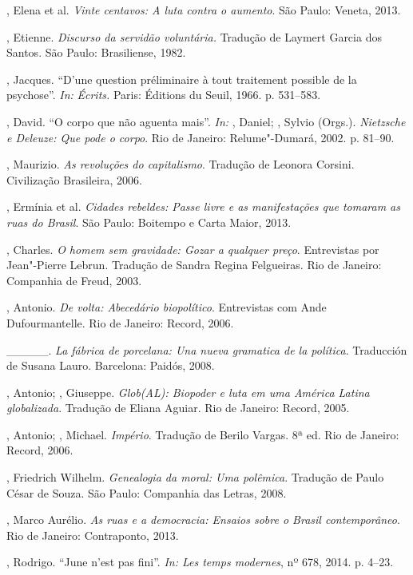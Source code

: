 \begin{Parskip}
, Elena et al. \emph{Vinte centavos: A luta contra
o aumento}. São Paulo: Veneta, 2013.

, Etienne. \emph{Discurso da servidão voluntária.
}Tradução de Laymert Garcia dos Santos. São Paulo: Brasiliense, 1982.

, Jacques. ``D'une question préliminaire à tout traitement
possible de la psychose''. \emph{In:} \emph{Écrits.} Paris: Éditions du
Seuil, 1966. p. 531--583.

, David. ``O corpo que não aguenta mais''. \emph{In: },
Daniel; , Sylvio (Orgs.).\emph{ Nietzsche e Deleuze: Que pode o
corpo}. Rio de Janeiro: Relume"-Dumará, 2002. p. 81--90.

, Maurizio. \emph{As revoluções do capitalismo}.
Tradução de Leonora Corsini. Civilização Brasileira, 2006.

, Ermínia et al. \emph{Cidades rebeldes: Passe livre e
as manifestações que tomaram as ruas do Brasil}. São Paulo: Boitempo e
Carta Maior, 2013.

, Charles. \emph{O homem sem gravidade: Gozar a qualquer
preço}. Entrevistas por Jean"-Pierre Lebrun. Tradução de Sandra Regina
Felgueiras. Rio de Janeiro: Companhia de Freud, 2003.

, Antonio. \emph{De volta: Abecedário biopolítico}.
Entrevistas com Ande Dufourmantelle. Rio de Janeiro: Record, 2006.

\_\_\_\_\_. \emph{La fábrica de porcelana: Una nueva
gramatica de la política}. Traducción de Susana Lauro. Barcelona: Paidós, 2008.

, Antonio; , Giuseppe. \emph{Glob(AL): Biopoder e luta
em uma América Latina globalizada}. Tradução de Eliana Aguiar. Rio de
Janeiro: Record, 2005.

, Antonio; , Michael. \emph{Império}.
Tradução de Berilo Vargas. 8ª ed. Rio de Janeiro: Record, 2006.

, Friedrich Wilhelm. \emph{Genealogia da moral: Uma
polêmica}. Tradução de Paulo César de Souza. São Paulo: Companhia das
Letras, 2008.

, Marco Aurélio. \emph{As ruas e a democracia: Ensaios
sobre o Brasil contemporâneo}. Rio de Janeiro: Contraponto, 2013.

, Rodrigo. ``June n'est pas fini''. \emph{In: Les temps modernes},
nº 678, 2014. p. 4--23.


\end{Parskip}
